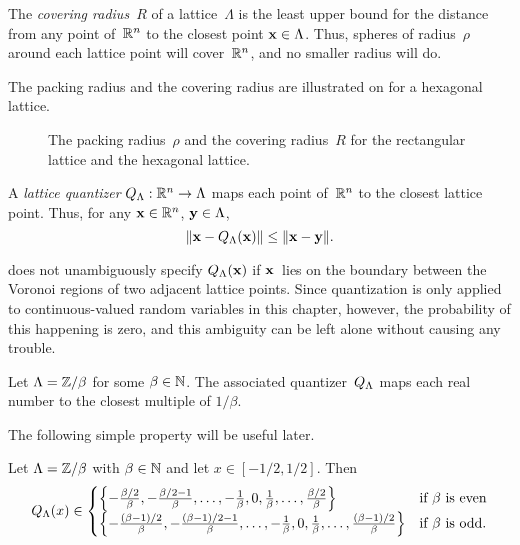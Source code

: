 \begin{definition}
  The \emph{covering radius}~$R$ of a lattice~$\Lambda$ is the least upper
  bound for the distance from any point of~$\mathbb{R}^n$ to the closest point $\mathbf{x} \in
  \Lambda$. Thus, spheres of radius~$\rho$ around each lattice point will
  cover~$\mathbb{R}^n$, and no smaller radius will do.~\cite{ConwayS1988}
\end{definition}

The packing radius and the covering radius are illustrated on
 for a hexagonal lattice.
\begin{figure}[tbp]
  \begin{center}
    
  \end{center}
  \caption{The packing radius~$\rho$ and the covering radius~$R$ for the
  rectangular lattice and the hexagonal lattice.}
  \label{fig:packingcoveringr}
\end{figure}

\begin{definition}
  \label{def:latticequant}
  A \emph{lattice quantizer} ${Q_{\Lambda}} : \mathbb{R}^n \rightarrow \Lambda$ maps each point
  of~$\mathbb{R}^n$ to the closest lattice point. Thus, for any $\mathbf{x} \in \mathbb{R}^n$, $\mathbf{y} \in
  \Lambda$,
  \begin{equation*}
    \| \mathbf{x} - {Q_{\Lambda}}(\mathbf{x}) \| \le \|\mathbf{x} - \mathbf{y}\|.
  \end{equation*}
\end{definition}

\begin{remark}
  \label{rem:latticequant}
   does not unambiguously specify ${Q_{\Lambda}}(\mathbf{x})$ if $\mathbf{x}$~lies on
  the boundary between the Voronoi regions of two adjacent lattice points. Since
  quantization is only applied to continuous-valued random variables in this
  chapter, however, the probability of this happening is zero, and this
  ambiguity can be left alone without causing any trouble.
\end{remark}

\begin{example}
  Let $\Lambda = \mathbb{Z} / \beta$ for some $\beta \in {\mathbb{N}}$. The associated
  quantizer~${Q_{\Lambda}}$ maps each real number to the closest multiple of $1/\beta$.
\end{example}

The following simple property will be useful later.
\begin{proposition}
  Let $\Lambda = \mathbb{Z} / \beta$ with $\beta \in {\mathbb{N}}$ and let $x \in [-1/2, 1/2]$.
  Then
  \begin{equation*}
    {Q_{\Lambda}}(x) \in
    \begin{cases}
      \left\{ -\frac{\beta/2}{\beta}, -\frac{\beta/2 - 1}{\beta}, \dots, 
      -\frac{1}{\beta}, 0, \frac1\beta, \dots, \frac{\beta/2}{\beta} \right\}
      & \text{if $\beta$ is even} \\
      \left\{ -\frac{(\beta - 1)/2}{\beta}, -\frac{(\beta-1)/2 - 1}{\beta}, 
      \dots, -\frac1\beta, 0, \frac1\beta, \dots, \frac{(\beta-1)/2}{\beta}
      \right\}
      & \text{if $\beta$ is odd}.
    \end{cases}
  \end{equation*}
\end{proposition}

